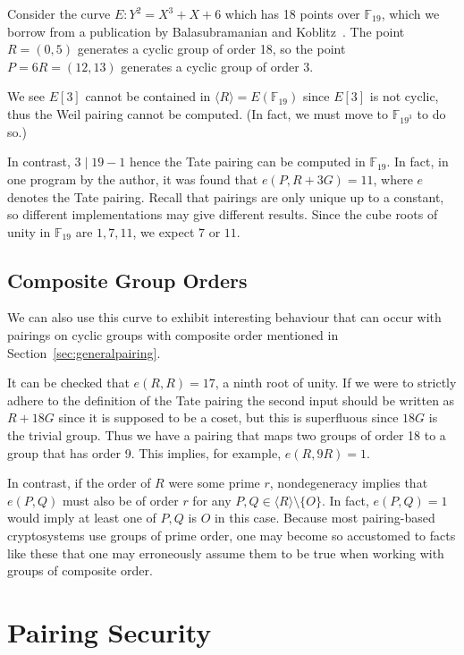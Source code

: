 Consider the curve $E: Y^2 = X^3 + X + 6$ which has
18 points over $\mathbb{F}_{19}$, which we borrow from a publication by
Balasubramanian and Koblitz~\cite{bk}.
The point $R=(0,5)$ generates a cyclic group of order 18,
so the point $P = 6R = (12,13)$ generates a cyclic group of order 3.

We see $E[3]$ cannot be contained in $\langle R \rangle = E(\mathbb{F}_{19})$
since $E[3]$ is not cyclic, thus the Weil pairing cannot be computed.
(In fact, we must move to $\mathbb{F}_{19^3}$ to do so.)

In contrast, $3 \mid 19-1$ hence the Tate pairing can be
computed in $\mathbb{F}_{19}$. In fact, in one program by the author, it was
found that $e(P, R + 3G) = 11$, where
$e$ denotes the Tate pairing.
Recall that pairings are only unique up to a constant, so different
implementations may give different results.
Since the cube roots of unity in
$\mathbb{F}_{19}$ are $1, 7, 11$, we expect $7$ or $11$.

\subsection {\label{sec:compositeexample} Composite Group Orders}

We can also use this curve to exhibit
interesting behaviour that can occur with
pairings on cyclic groups with composite order mentioned in Section~\ref{sec:generalpairing}.

It can be checked that $e(R, R) = 17$, a ninth root of unity.
If we were to strictly adhere to the definition of the Tate pairing
the second input should be written as $R + 18G$ since it is supposed to be
a coset, but this is superfluous since $18G$ is the trivial group.
Thus we have a pairing that maps two groups of order 18
to a group that has order 9.
This implies, for example, $e(R, 9R) = 1$.

In contrast, if the order of $R$ were some prime $r$, nondegeneracy implies
that $e(P, Q)$ must also be of order $r$ for any
$P, Q \in \langle R \rangle \setminus \{ O \}$.
In fact, $e(P, Q) = 1$ would imply at least one of $P, Q$ is $O$ in this case.
Because most pairing-based cryptosystems use groups of prime order,
one may become so accustomed to facts like these that one may erroneously
assume them to be true when working with groups of composite order.

\section {\label{sec:pairingsec}Pairing Security}

